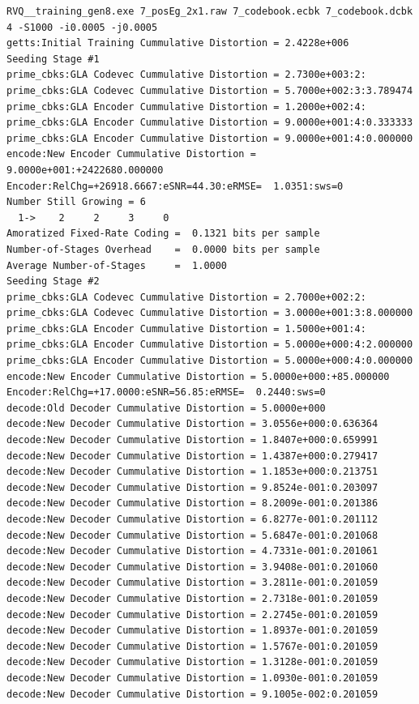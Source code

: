 \scriptsize
\begin{verbatim}
RVQ__training_gen8.exe 7_posEg_2x1.raw 7_codebook.ecbk 7_codebook.dcbk 4 -S1000 -i0.0005 -j0.0005 
getts:Initial Training Cummulative Distortion = 2.4228e+006
Seeding Stage #1
prime_cbks:GLA Codevec Cummulative Distortion = 2.7300e+003:2:
prime_cbks:GLA Codevec Cummulative Distortion = 5.7000e+002:3:3.789474
prime_cbks:GLA Encoder Cummulative Distortion = 1.2000e+002:4:
prime_cbks:GLA Encoder Cummulative Distortion = 9.0000e+001:4:0.333333
prime_cbks:GLA Encoder Cummulative Distortion = 9.0000e+001:4:0.000000
encode:New Encoder Cummulative Distortion = 9.0000e+001:+2422680.000000
Encoder:RelChg=+26918.6667:eSNR=44.30:eRMSE=  1.0351:sws=0
Number Still Growing = 6
  1->    2     2     3     0 
Amoratized Fixed-Rate Coding =  0.1321 bits per sample
Number-of-Stages Overhead    =  0.0000 bits per sample
Average Number-of-Stages     =  1.0000
Seeding Stage #2
prime_cbks:GLA Codevec Cummulative Distortion = 2.7000e+002:2:
prime_cbks:GLA Codevec Cummulative Distortion = 3.0000e+001:3:8.000000
prime_cbks:GLA Encoder Cummulative Distortion = 1.5000e+001:4:
prime_cbks:GLA Encoder Cummulative Distortion = 5.0000e+000:4:2.000000
prime_cbks:GLA Encoder Cummulative Distortion = 5.0000e+000:4:0.000000
encode:New Encoder Cummulative Distortion = 5.0000e+000:+85.000000
Encoder:RelChg=+17.0000:eSNR=56.85:eRMSE=  0.2440:sws=0
decode:Old Decoder Cummulative Distortion = 5.0000e+000
decode:New Decoder Cummulative Distortion = 3.0556e+000:0.636364
decode:New Decoder Cummulative Distortion = 1.8407e+000:0.659991
decode:New Decoder Cummulative Distortion = 1.4387e+000:0.279417
decode:New Decoder Cummulative Distortion = 1.1853e+000:0.213751
decode:New Decoder Cummulative Distortion = 9.8524e-001:0.203097
decode:New Decoder Cummulative Distortion = 8.2009e-001:0.201386
decode:New Decoder Cummulative Distortion = 6.8277e-001:0.201112
decode:New Decoder Cummulative Distortion = 5.6847e-001:0.201068
decode:New Decoder Cummulative Distortion = 4.7331e-001:0.201061
decode:New Decoder Cummulative Distortion = 3.9408e-001:0.201060
decode:New Decoder Cummulative Distortion = 3.2811e-001:0.201059
decode:New Decoder Cummulative Distortion = 2.7318e-001:0.201059
decode:New Decoder Cummulative Distortion = 2.2745e-001:0.201059
decode:New Decoder Cummulative Distortion = 1.8937e-001:0.201059
decode:New Decoder Cummulative Distortion = 1.5767e-001:0.201059
decode:New Decoder Cummulative Distortion = 1.3128e-001:0.201059
decode:New Decoder Cummulative Distortion = 1.0930e-001:0.201059
decode:New Decoder Cummulative Distortion = 9.1005e-002:0.201059

\end{verbatim}
